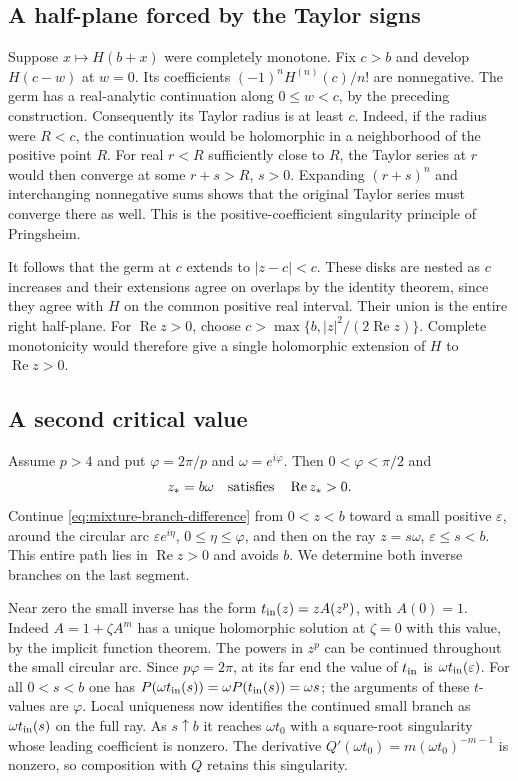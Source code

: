 \documentclass[11pt,a4paper]{article}
\numberwithin{equation}{section}
\renewcommand{\Re}{\operatorname{Re}}\renewcommand{\Im}{\operatorname{Im}}
\begin{document}
\subsection{A half-plane forced by the Taylor signs}
Suppose $x\mapsto H(b+x)$ were completely monotone.
Fix $c>b$ and develop $H(c-w)$ at $w=0$. Its coefficients
$(-1)^n H^{(n)}(c)/n!$ are nonnegative. The germ has a real-analytic
continuation along $0\le w<c$, by the preceding construction.
Consequently its Taylor radius is at least $c$. Indeed, if the radius
were $R<c$, the continuation would be holomorphic in a neighborhood
of the positive point $R$. For real $r<R$ sufficiently close to $R$,
the Taylor series at $r$ would then converge at some $r+s>R$,
$s>0$. Expanding $(r+s)^n$ and interchanging nonnegative sums shows
that the original Taylor series must converge there as well. This
is the positive-coefficient singularity principle of Pringsheim.

It follows that the germ at $c$ extends to $|z-c|<c$. These disks
are nested as $c$ increases and their extensions agree on overlaps
by the identity theorem, since they agree with $H$ on the common
positive real interval. Their union is the entire right half-plane. For $\Re z>0$, choose $c>\max\{b, |z|^2/(2\Re z)\}$. Complete
monotonicity would therefore give a single holomorphic extension of
$H$ to $\Re z>0$.

\subsection{A second critical value}
Assume $p>4$ and put $\varphi=2\pi/p$ and $\omega=e^{i\varphi}$.
Then $0<\varphi<\pi/2$ and
\[
 z_*=b\omega\quad\hbox{satisfies}\quad \Re z_*>0 .
\]
Continue \eqref{eq:mixture-branch-difference} from $0<z<b$ toward
a small positive $\varepsilon$, around the circular arc
$\varepsilon e^{i\eta}$, $0\le\eta\le\varphi$, and then on the ray
$z=s\omega$, $\varepsilon\le s<b$. This entire path lies in
$\Re z>0$ and avoids $b$. We determine both inverse branches on
the last segment.

Near zero the small inverse has the form
$t_{\rm in}(z)=z A(z^p)$, with $A(0)=1$. Indeed $A=1+\zeta A^m$
has a unique holomorphic solution at $\zeta=0$ with this value,
by the implicit function theorem. The powers in $z^p$ can be
continued throughout the small circular arc. Since $p\varphi=2\pi$,
at its far end the value of $t_{\rm in}$ is
$\omega t_{\rm in}(\varepsilon)$. For all $0<s<b$ one has
$P(\omega t_{\rm in}(s))=\omega P(t_{\rm in}(s))=\omega s$;
the arguments of these $t$-values are $\varphi$. Local uniqueness
now identifies the continued small branch as $\omega t_{\rm in}(s)$
on the full ray. As $s\uparrow b$ it reaches $\omega t_0$ with a
square-root singularity whose leading coefficient is nonzero.
The derivative $Q'(\omega t_0)=m(\omega t_0)^{-m-1}$ is nonzero,
so composition with $Q$ retains this singularity.
\end{document}

